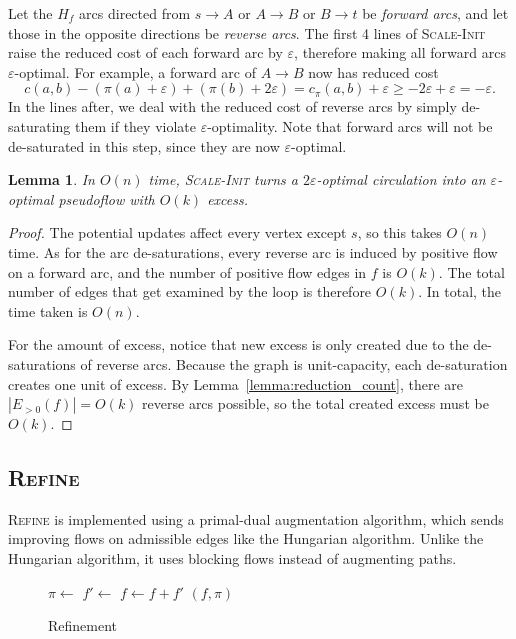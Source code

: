 \documentclass[11pt]{article}
\def\eps{\varepsilon}
\theoremstyle{plain}
\newtheorem{lemma}{Lemma}[section]
\numberwithin{figure}{section}
\begin{document}
Let the $H_f$ arcs directed from $s \to A$ or $A \to B$ or $B \to t$ be
\emph{forward arcs}, and let those in the opposite directions be
\emph{reverse arcs}.
The first 4 lines of \textsc{Scale-Init} raise the reduced cost of each
forward arc by $\eps$, therefore making all forward arcs $\eps$-optimal.
For example, a forward arc of $A \to B$ now has reduced cost
\begin{equation*}
	c(a, b) - (\pi(a) + \eps) + (\pi(b) + 2\eps)
	= c_\pi(a, b) + \eps
	\geq -2\eps + \eps
	= -\eps.
\end{equation*}
In the lines after, we deal with the reduced cost of reverse arcs by simply
de-saturating them if they violate $\eps$-optimality.
Note that forward arcs will not be de-saturated in this step, since they are
now $\eps$-optimal.

\begin{lemma}
\label{lemma:scale_init}
In $O(n)$ time, \textsc{Scale-Init} turns a $2\eps$-optimal circulation into an
$\eps$-optimal pseudoflow with $O(k)$ excess.
\end{lemma}

\begin{proof}
The potential updates affect every vertex except $s$, so this takes $O(n)$
time.
As for the arc de-saturations, every reverse arc is induced by positive flow on
a forward arc, and the number of positive flow edges in $f$ is $O(k)$.
The total number of edges that get examined by the loop is therefore $O(k)$.
In total, the time taken is $O(n)$.

For the amount of excess, notice that new excess is only created due to the
de-saturations of reverse arcs.
Because the graph is unit-capacity, each de-saturation creates one unit of
excess.
By Lemma~\ref{lemma:reduction_count}, there are $|E_{>0}(f)| = O(k)$ reverse
arcs possible, so the total created excess must be $O(k)$.
\end{proof}

\subsection{\textsc{Refine}}

\textsc{Refine} is implemented using a primal-dual augmentation algorithm,
which sends improving flows on admissible edges like the Hungarian algorithm.
Unlike the Hungarian algorithm, it uses blocking flows instead of augmenting
paths.

\begin{figure*}
\centering
\begin{minipage}{.8\linewidth}
\begin{algorithm}[H]
\caption{Refinement}
\begin{algorithmic}[1]
		\State $\pi \gets$ 
		\State $f' \gets$ 
		\State $f \gets f + f'$
	\EndWhile
	\State\Return $(f, \pi)$
\EndFunction
\end{algorithmic}
\end{algorithm}
\end{minipage}
\end{figure*}
\end{document}
